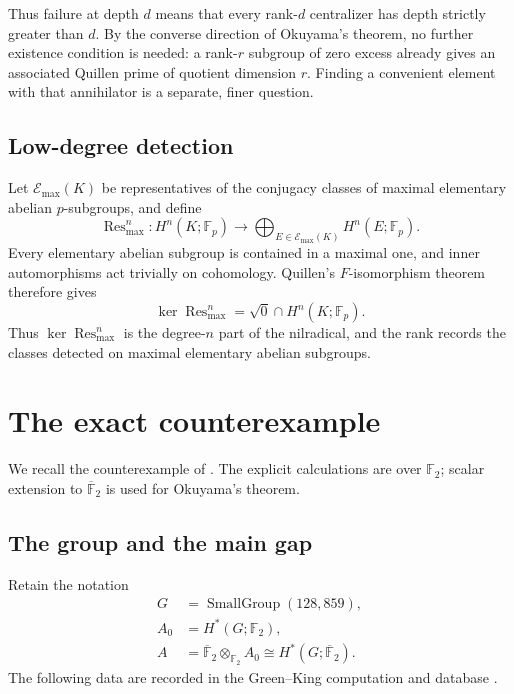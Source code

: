 \documentclass[11pt]{amsart}
\theoremstyle{definition}
\theoremstyle{remark}
\newcommand{\F}{\mathbb F}
\newcommand{\kbar}{\overline{\mathbb F}_{2}}
\newcommand{\SG}[2]{\operatorname{SmallGroup}(#1,#2)}
\newcommand{\EA}{\mathcal E}
\newcommand{\Res}{\operatorname{Res}}
\begin{document}
Thus failure at depth $d$ means that every rank-$d$ centralizer has depth strictly greater than $d$.  By the converse direction of Okuyama's theorem, no further existence condition is needed: a rank-$r$ subgroup of zero excess already gives an associated Quillen prime of quotient dimension $r$.  Finding a convenient element with that annihilator is a separate, finer question.

\subsection{Low-degree detection}

Let $\EA_{\max}(K)$ be representatives of the conjugacy classes of maximal elementary abelian $p$-subgroups, and define
\[
\Res^n_{\max}:
H^n(K;\F_p)\longrightarrow
\bigoplus_{E\in\EA_{\max}(K)}H^n(E;\F_p).
\]
Every elementary abelian subgroup is contained in a maximal one, and inner automorphisms act trivially on cohomology.  Quillen's $F$-isomorphism theorem therefore gives
\begin{equation}
\label{eq:nil-kernel}
\ker\Res^n_{\max}=\sqrt{0}\cap H^n(K;\F_p).
\end{equation}
Thus $\ker\Res^n_{\max}$ is the degree-$n$ part of the nilradical, and the rank records the classes detected on maximal elementary abelian subgroups.


\section{The exact counterexample}
\label{sec:counterexample}

We recall the counterexample of \cite{DaiEtAl2026}.  The explicit calculations are over \(\F_2\); scalar extension to \(\kbar\) is used for Okuyama's theorem.

\subsection{The group and the main gap}

Retain the notation
\[
\begin{aligned}
G&=\SG{128}{859},\\
A_0&=H^*(G;\F_2),\\
A&=\kbar\otimes_{\F_2}A_0\cong H^*(G;\kbar).
\end{aligned}
\]
The following data are recorded in the Green--King computation and database \cite{GreenKing2011,GreenKingDatabase}.
\end{document}
